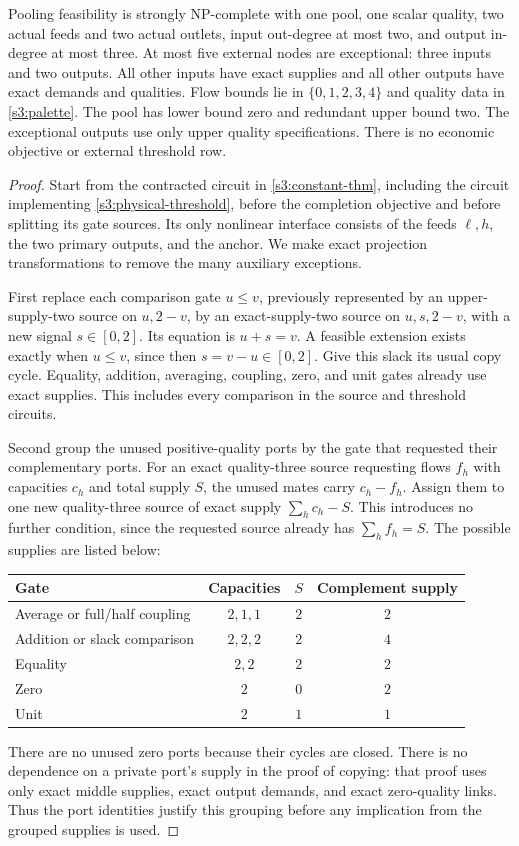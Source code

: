 \begin{theorem}\label{s3:five-thm}
Pooling feasibility is strongly NP-complete with one pool, one scalar
quality, two actual feeds and two actual outlets, input out-degree at
most two, and output in-degree at most three. At most five external
nodes are exceptional: three inputs and two outputs. All other inputs
have exact supplies and all other outputs have exact demands and
qualities. Flow bounds lie in $\{0,1,2,3,4\}$ and quality data in
\eqref{s3:palette}. The pool has lower bound zero and redundant upper
bound two. The exceptional outputs use only upper quality specifications.
There is no economic objective or external threshold row.
\end{theorem}
\begin{proof}
Start from the contracted circuit in \cref{s3:constant-thm}, including
the circuit implementing \eqref{s3:physical-threshold}, before the
completion objective and before splitting its gate sources. Its only
nonlinear interface consists of the feeds $\ell,h$, the two primary
outputs, and the anchor. We make exact projection transformations to
remove the many auxiliary exceptions.

First replace each comparison gate $u\le v$, previously represented by
an upper-supply-two source on $u,2-v$, by an exact-supply-two source on
$u,s,2-v$, with a new signal $s\in[0,2]$. Its equation is $u+s=v$.
A feasible extension exists exactly when $u\le v$, since then
$s=v-u\in[0,2]$. Give this slack its usual copy cycle. Equality,
addition, averaging, coupling, zero, and unit gates already use exact
supplies. This includes every comparison in the source and threshold
circuits.

Second group the unused positive-quality ports by the gate that requested
their complementary ports. For an exact quality-three source requesting
flows $f_h$ with capacities $c_h$ and total supply $S$, the unused mates
carry $c_h-f_h$. Assign them to one new quality-three source of exact
supply $\sum_hc_h-S$. This introduces no further condition, since the
requested source already has $\sum_hf_h=S$. The possible supplies are
listed below:
\begin{center}
\begin{tabular}{lccc}
\toprule
Gate & Capacities & $S$ & Complement supply\\
\midrule
Average or full/half coupling & $2,1,1$ & $2$ & $2$\\
Addition or slack comparison & $2,2,2$ & $2$ & $4$\\
Equality & $2,2$ & $2$ & $2$\\
Zero & $2$ & $0$ & $2$\\
Unit & $2$ & $1$ & $1$\\
\bottomrule
\end{tabular}
\end{center}
There are no unused zero ports because their cycles are closed. There
is no dependence on a private port's supply in the proof of copying:
that proof uses only exact middle supplies, exact output demands, and
exact zero-quality links. Thus the port identities justify this grouping
before any implication from the grouped supplies is used.


\end{proof}
